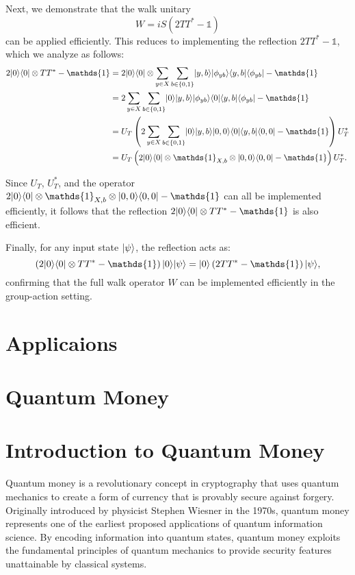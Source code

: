 \documentclass[11pt]{article}
\theoremstyle{definition}
\begin{document}
Next, we demonstrate that the walk unitary
\[
W = iS(2TT^* - \mathds{1})
\]
can be applied efficiently. This reduces to implementing the reflection \( 2TT^* - \mathds{1} \), which we analyze as follows:
\begin{align*}
2\ket{0}\bra{0} \otimes TT^* - \mathds{1}
&= 2\ket{0}\bra{0} \otimes \sum_{y \in X} \sum_{b \in \{0,1\}} \ket{y,b} \ket{\phi_{yb}} \bra{y,b} \bra{\phi_{yb}} - \mathds{1} \\
&= 2\sum_{y \in X} \sum_{b \in \{0,1\}} \ket{0} \ket{y,b} \ket{\phi_{yb}} \bra{0} \bra{y,b} \bra{\phi_{yb}} - \mathds{1} \\
&= U_T \left( 2 \sum_{y \in X} \sum_{b \in \{0,1\}} \ket{0} \ket{y,b} \ket{0,0} \bra{0} \bra{y,b} \bra{0,0} - \mathds{1} \right) U_T^* \\
&= U_T \left( 2\ket{0}\bra{0} \otimes \mathds{1}_{X,b} \otimes \ket{0,0}\bra{0,0} - \mathds{1} \right) U_T^*.
\end{align*}

Since \( U_T \), \( U_T^* \), and the operator \( 2\ket{0}\bra{0} \otimes \mathds{1}_{X,b} \otimes \ket{0,0}\bra{0,0} - \mathds{1} \) can all be implemented efficiently, it follows that the reflection \( 2\ket{0}\bra{0} \otimes TT^* - \mathds{1} \) is also efficient.

Finally, for any input state \( \lvert\psi\rangle \), the reflection acts as:
\[
\left(2\ket{0}\bra{0} \otimes TT^* - \mathds{1} \right) \ket{0} \ket{\psi} = \ket{0} \left(2TT^* - \mathds{1} \right) \ket{\psi},
\]
confirming that the full walk operator \( W \) can be implemented efficiently in the group-action setting.










\section{Applicaions}
\section{Quantum Money}
\section*{Introduction to Quantum Money}
Quantum money is a revolutionary concept in cryptography that uses quantum mechanics to create a form of currency that is provably secure against forgery. Originally introduced by physicist Stephen Wiesner in the 1970s, quantum money represents one of the earliest proposed applications of quantum information science. By encoding information into quantum states, quantum money exploits the fundamental principles of quantum mechanics to provide security features unattainable by classical systems.
\end{document}
